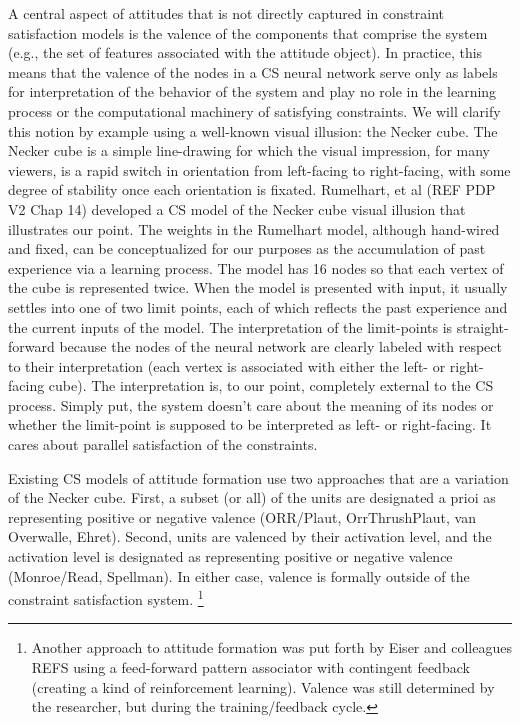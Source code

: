 \documentclass{article}
\begin{document}
A central aspect of attitudes that is not directly captured in constraint satisfaction models is the valence of the components that comprise the system (e.g., the set of features associated with the attitude object).  In practice, this means that the valence of the nodes in a CS neural network serve only as labels for interpretation of the behavior of the system and play no role in the learning process or the computational machinery of satisfying constraints.  We will clarify this notion by example using a well-known visual illusion: the Necker cube.  The Necker cube is a simple line-drawing for which the visual impression, for many viewers, is a rapid switch in orientation from left-facing to right-facing, with some degree of stability once each orientation is fixated.  Rumelhart, et al (REF PDP V2 Chap 14) developed a CS model of the Necker cube visual illusion that illustrates our point. The weights in the Rumelhart model, although hand-wired and fixed, can be conceptualized for our purposes as the accumulation of past experience via a learning process.  The model has 16 nodes so that each vertex of the cube is represented twice.  When the model is presented with input, it usually settles into one of two limit points, each of which reflects the past experience and the current inputs of the model.  The interpretation of the limit-points is straight-forward because the nodes of the neural network are clearly labeled with respect to their interpretation (each vertex is associated with either the left- or right-facing cube).  The interpretation is, to our point, completely external to the CS process.  Simply put, the system doesn't care about the meaning of its nodes or whether the limit-point is supposed to be interpreted as left- or right-facing.  It cares about parallel satisfaction of the constraints.  

Existing CS models of attitude formation use two approaches that are a variation of the Necker cube.  First, a subset (or all) of the units are designated a prioi as representing positive or negative valence (ORR/Plaut, OrrThrushPlaut, van Overwalle, Ehret). Second, units are valenced by their activation level, and the activation level is designated as representing positive or negative valence (Monroe/Read, Spellman). In either case, valence is formally outside of the constraint satisfaction system.   \footnote{Another approach to attitude formation was put forth by Eiser and colleagues REFS using a feed-forward pattern associator with contingent feedback (creating a kind of reinforcement learning).  Valence was still determined by the researcher, but during the training/feedback cycle.} 
\end{document}
